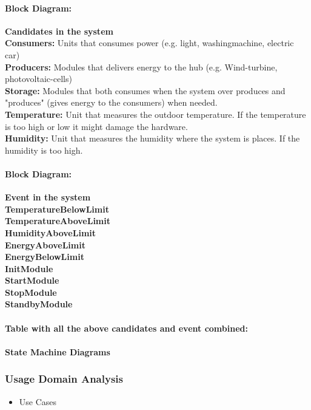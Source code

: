			\paragraph{Block Diagram:}
				\textbf{Candidates in the system}
				\\\textbf{Consumers:} Units that consumes power (e.g. light, washingmachine, electric car)
				\\\textbf{Producers:} Modules that delivers energy to the hub (e.g. Wind-turbine, photovoltaic-cells)
				\\\textbf{Storage:} Modules that both consumes when the system over produces and "produces" (gives energy to the consumers) when needed. 
				\\\textbf{Temperature:} Unit that measures the outdoor temperature. If the temperature is too high or low it might damage the hardware.
				\\\textbf{Humidity:} Unit that measures the humidity where the system is places. If the humidity is too high.
				\newline
			\paragraph{Block Diagram:}
				\textbf{Event in the system}
				\\\textbf{TemperatureBelowLimit}
				\\\textbf{TemperatureAboveLimit}
				\\\textbf{HumidityAboveLimit}
				\\\textbf{EnergyAboveLimit}
				\\\textbf{EnergyBelowLimit}
				\\\textbf{InitModule}
				\\\textbf{StartModule}
				\\\textbf{StopModule}
				\\\textbf{StandbyModule}
				\\\\\textbf{Table with all the above candidates and event combined:}
				\newline
			\paragraph{State Machine Diagrams}
			
			
	\subsubsection{Usage Domain Analysis}
		\begin{itemize}
			\item Use Cases
		\end{itemize}
